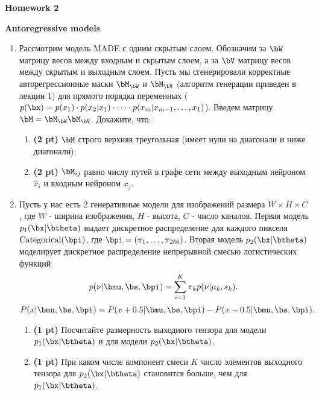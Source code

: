\documentclass{article}
\begin{document}
\begin{center}
    {\Large \textbf{Homework 2}} \\
\end{center}

{\large \textbf{Autoregressive models}}
\begin{enumerate}
    \item Рассмотрим модель MADE с одним скрытым слоем. Обозначим за $\bW$ матрицу весов между входным и скрытым слоем, а за $\bV$ матрицу весов между скрытым и выходным слоем. Пусть мы сгенерировали корректные авторегрессионные маски $\bM_{\bW}$ и $\bM_{\bV}$ (алгоритм генерации приведен в лекции 1) для прямого порядка переменных ($p(\bx) = p(x_1) \cdot p(x_2 | x_1) \cdot \dots \cdot p(x_m | x_{m-1}, \dots, x_1)$). Введем матрицу $\bM = \bM_{\bW} \bM_{\bV}$. Докажите, что:
    \begin{enumerate}
    	\item  \textbf{(2 pt)} $\bM$ строго верхняя треугольная (имеет нули на диагонали и ниже диагонали);
    	\item  \textbf{(2 pt)} $\bM_{ij}$ равно числу путей в графе сети между выходным нейроном $\hat{x}_i$ и входным нейроном $x_j$.
    \end{enumerate}
    \item Пусть у нас есть 2 генеративные модели для изображений размера $W \times H \times C$, где $W$ - ширина изображения, $H$ - высота, $C$ - число каналов. Первая модель $p_1(\bx | \btheta)$ выдает дискретное распределение для каждого пикселя $\text{Categorical}(\bpi)$, где $\bpi = (\pi_1, \dots,  \pi_{256})$. Вторая модель $p_2(\bx | \btheta)$ моделирует дискретное распределение непрерывной смесью логистических функций
   		\[
  				p(\nu | \bmu, \bs, \bpi) = \sum_{i=1}^K \pi_k p(\nu | \mu_k, s_k).
		\]
    	\[
    		P(x | \bmu, \bs, \bpi) = P(x + 0.5 | \bmu, \bs, \bpi) - P(x - 0.5 | \bmu, \bs, \bpi).
    	\]
    	\begin{enumerate}
    		\item \textbf{(1 pt)} Посчитайте размерность выходного тензора для модели $p_1(\bx | \btheta)$ и для модели $p_2(\bx | \btheta)$. 
    		\item \textbf{(1 pt)} При каком числе компонент смеси $K$ число элементов выходного тензора для $p_2(\bx | \btheta)$ становится больше, чем для $p_1(\bx | \btheta)$.
    	\end{enumerate}
\end{enumerate}
\end{document}
